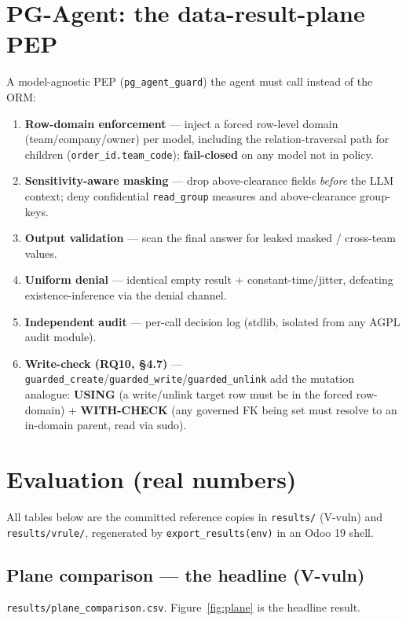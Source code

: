 \documentclass[11pt,a4paper]{article}
\newcommand{\code}[1]{\texttt{#1}}
\begin{document}
\section{PG-Agent: the data-result-plane PEP}
A model-agnostic PEP (\code{pg_agent_guard}) the agent must call instead of the ORM:
\begin{enumerate}[leftmargin=*]
  \item \textbf{Row-domain enforcement} --- inject a forced row-level domain (team/company/owner) per model,
        including the relation-traversal path for children (\code{order_id.team_code}); \textbf{fail-closed} on
        any model not in policy.
  \item \textbf{Sensitivity-aware masking} --- drop above-clearance fields \emph{before} the LLM context; deny
        confidential \code{read_group} measures and above-clearance group-keys.
  \item \textbf{Output validation} --- scan the final answer for leaked masked / cross-team values.
  \item \textbf{Uniform denial} --- identical empty result + constant-time/jitter, defeating
        existence-inference via the denial channel.
  \item \textbf{Independent audit} --- per-call decision log (stdlib, isolated from any AGPL audit module).
  \item \textbf{Write-check (RQ10, \S4.7)} --- \code{guarded\_create}/\code{guarded\_write}/\code{guarded\_unlink}
        add the mutation analogue: \textbf{USING} (a write/unlink target row must be in the forced row-domain) +
        \textbf{WITH-CHECK} (any governed FK being set must resolve to an in-domain parent, read via sudo).
\end{enumerate}

\section{Evaluation (real numbers)}
All tables below are the committed reference copies in \code{results/} (V-vuln) and \code{results/vrule/},
regenerated by \code{export_results(env)} in an Odoo 19 shell.

\subsection{Plane comparison --- the headline (V-vuln)}
\code{results/plane_comparison.csv}. Figure~\ref{fig:plane} is the headline result.
\end{document}
